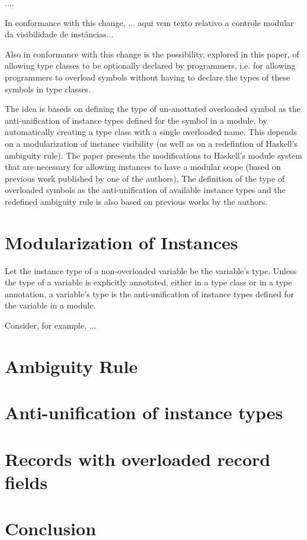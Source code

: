 \documentclass{article}
\begin{document}
....


In conformance with this change, ... aqui vem texto relativo a
controle modular da visibilidade de instâncias...

Also in conformance with this change is the possibility, explored in
this paper, of allowing type classes to be optionally declared by
programmers, i.e. for allowing programmers to overload symbols without
having to declare the types of these symbols in type classes.

The idea is baseds on defining the type of un-anottated overloaded
symbol as the anti-unification of instance types defined for the
symbol in a module, by automatically creating a type class with a
single overloaded name. This depends on a modularization of instance
visibility (as well as on a redefintion of Haskell's ambiguity rule).
The paper presents the modifications to Haskell's module system that
are necessary for allowing instances to have a modular scope (based on
previous work published by one of the authors). The definition of the
type of overloaded symbols as the anti-unification of available
instance types and the redefined ambiguity rule is also based on
previous works by the authors. 

\section{Modularization of Instances}
\label{sec:modular-instances}

Let the instance type of a non-overloaded variable be the variable's
type. Unless the type of a variable is explicitly annotated, either in
a type class or in a type annotation, a variable's type is the
anti-unification of instance types defined for the variable in a
module.

Consider, for example, ...

\section{Ambiguity Rule}
\label{sec:ambig}

\section{Anti-unification of instance types}
\label{sec:anti-unif}

\section{Records with overloaded record fields}
\label{sec:overloaded-record-fields}

\section{Conclusion}
\label{sec:conclusion}



\end{document}
